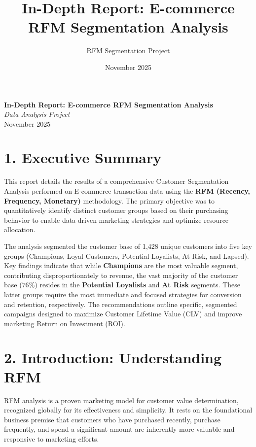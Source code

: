 \documentclass{article}
\title{In-Depth Report: E-commerce RFM Segmentation Analysis}
\author{RFM Segmentation Project}
\date{November 2025}
\begin{document}
\begin{center}
    \vspace*{3cm} %
    
    \fontsize{30pt}{36pt}\selectfont %
    \textbf{In-Depth Report: E-commerce RFM Segmentation Analysis} \\
    
    \vspace{1cm}
    \large %
    \textit{Data Analysis Project} \\
    
    \vspace{0.2cm}
    \normalsize
    November 2025
    
\end{center}
\thispagestyle{empty} %

\newpage
\setcounter{page}{1} %

\section*{1. Executive Summary}
This report details the results of a comprehensive Customer Segmentation Analysis performed on E-commerce transaction data using the \textbf{RFM (Recency, Frequency, Monetary)} methodology. The primary objective was to quantitatively identify distinct customer groups based on their purchasing behavior to enable data-driven marketing strategies and optimize resource allocation.

The analysis segmented the customer base of 1,428 unique customers into five key groups (Champions, Loyal Customers, Potential Loyalists, At Risk, and Lapsed). Key findings indicate that while \textbf{Champions} are the most valuable segment, contributing disproportionately to revenue, the vast majority of the customer base ($76\%$) resides in the \textbf{Potential Loyalists} and \textbf{At Risk} segments. These latter groups require the most immediate and focused strategies for conversion and retention, respectively. The recommendations outline specific, segmented campaigns designed to maximize Customer Lifetime Value (CLV) and improve marketing Return on Investment (ROI).

\hrulefill

\section*{2. Introduction: Understanding RFM}
RFM analysis is a proven marketing model for customer value determination, recognized globally for its effectiveness and simplicity. It rests on the foundational business premise that customers who have purchased recently, purchase frequently, and spend a significant amount are inherently more valuable and responsive to marketing efforts.
\end{document}
